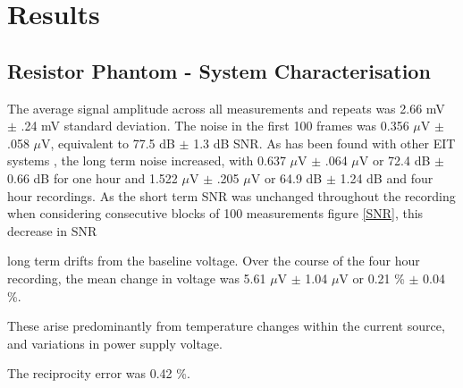 \section{Results}
\subsection{Resistor Phantom - System Characterisation}
The average signal amplitude across all measurements and repeats was 2.66 mV $\pm$ .24 mV standard deviation. The noise in the first 100 frames was 0.356 $\mu$V $\pm$ .058 $\mu$V, equivalent to 77.5 dB $\pm$ 1.3 dB SNR. As has been found with other EIT systems \cite{oh2007multi}, the long term noise increased, with 0.637 $\mu$V $\pm$ .064 $\mu$V or 72.4 dB $\pm$ 0.66 dB for one hour and 1.522 $\mu$V $\pm$ .205 $\mu$V or 64.9 dB $\pm$ 1.24 dB and four hour recordings. As the short term SNR was unchanged throughout the recording when considering consecutive blocks of 100 measurements figure \ref{SNR}, this decrease in SNR 


long term drifts from the baseline voltage. Over the course of the four hour recording, the mean change in voltage was 5.61 $\mu$V $\pm$ 1.04 $\mu$V or 0.21 \% $\pm$ 0.04 \%. 


These arise predominantly from temperature changes within the current source, and variations in power supply voltage.

The reciprocity error was 0.42 \%. 

